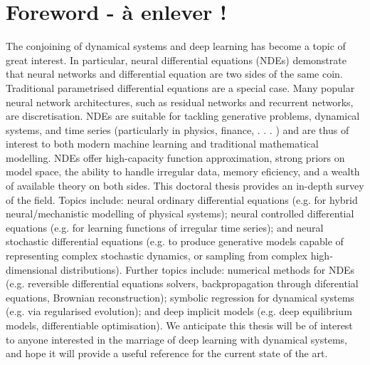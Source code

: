 \chapter*{Foreword - à enlever !} %


The conjoining of dynamical systems and deep learning has become a
topic of great interest. In particular, neural differential equations (NDEs)
demonstrate that neural networks and differential equation are two sides
of the same coin. Traditional parametrised differential equations are a
special case. Many popular neural network architectures, such as residual
networks and recurrent networks, are discretisation.
NDEs are suitable for tackling generative problems, dynamical systems,
and time series (particularly in physics, finance, . . . ) and are thus of
interest to both modern machine learning and traditional mathematical
modelling. NDEs offer high-capacity function approximation, strong priors
on model space, the ability to handle irregular data, memory eficiency,
and a wealth of available theory on both sides.
This doctoral thesis provides an in-depth survey of the field.
Topics include: neural ordinary differential equations (e.g. for hybrid
neural/mechanistic modelling of physical systems); neural controlled differential
equations (e.g. for learning functions of irregular time series);
and neural stochastic differential equations (e.g. to produce generative
models capable of representing complex stochastic dynamics, or sampling
from complex high-dimensional distributions).
Further topics include: numerical methods for NDEs (e.g. reversible
differential equations solvers, backpropagation through diferential equations,
Brownian reconstruction); symbolic regression for dynamical systems
(e.g. via regularised evolution); and deep implicit models (e.g. deep
equilibrium models, differentiable optimisation).
We anticipate this thesis will be of interest to anyone interested in the
marriage of deep learning with dynamical systems, and hope it will provide
a useful reference for the current state of the art.



